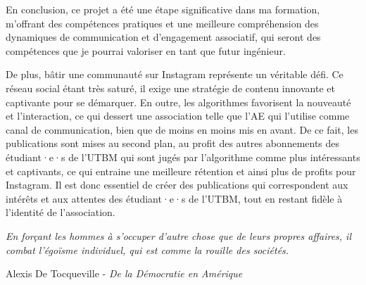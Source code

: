 En conclusion, ce projet a été une étape significative dans ma formation, m'offrant des compétences pratiques et une meilleure compréhension des dynamiques de communication et d'engagement associatif, qui seront des compétences que je pourrai valoriser en tant que futur ingénieur.

De plus, bâtir une communauté sur Instagram représente un véritable défi.
Ce réseau social étant très saturé, il exige une stratégie de contenu innovante et captivante pour se démarquer.
En outre, les algorithmes favorisent la nouveauté et l'interaction, ce qui dessert une association telle que l'\gls{AE} qui l'utilise comme canal de communication, bien que de moins en moins mis en avant.
De ce fait, les publications sont mises au second plan, au profit des autres abonnements des étudiant·e·s de l'\gls{UTBM} qui sont jugés par l'algorithme comme plus intéressants et captivants, ce qui entraine une meilleure rétention et ainsi plus de profits pour Instagram.
Il est donc essentiel de créer des publications qui correspondent aux intérêts et aux attentes des étudiant·e·s de l'\gls{UTBM}, tout en restant fidèle à l'identité de l'association.


\begin{center}
    \textit{\og En forçant les hommes à s'occuper d'autre chose que de leurs propres affaires, il combat l'égoïsme individuel, qui est comme la rouille des sociétés. \fg{}}

    Alexis De Tocqueville - \textit{De la Démocratie en Amérique}\cite{De_la_Democratie_en_Amerique}
\end{center}

